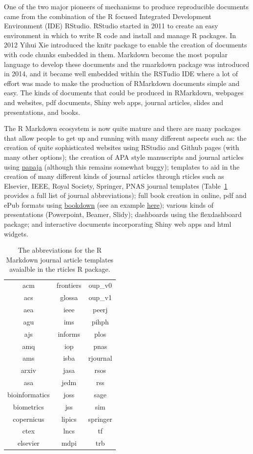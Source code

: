 \documentclass[
  letterpaper,
  DIV=11,
  numbers=noendperiod]{scrreprt}
\begin{document}
One of the two major pioneers of mechanisms to produce reproducible
documents came from the combination of the R focused Integrated
Development Environment (IDE) RStudio. RStudio started in 2011 to create
an easy environment in which to write R code and install and manage R
packages. In 2012 Yihui Xie introduced the knitr package to enable the
creation of documents with code chunks embedded in them. Markdown become
the most popular language to develop these documents and the rmarkdown
package was introduced in 2014, and it became well embedded within the
RSTudio IDE where a lot of effort was made to make the production of
RMarkdown documents simple and easy. The kinds of documents that could
be produced in RMarkdown, webpages and websites, pdf documents, Shiny
web apps, journal articles, slides and presentations, and books.

The R Markdown ecosystem is now quite mature and there are many packages
that allow people to get up and running with many different aspects such
as: the creation of quite sophisticated websites using RStudio and
Github pages (with many other options); the creation of APA style
manuscripts and journal articles using
\href{http://frederikaust.com/papaja_man/}{papaja} (although this
remains somewhat buggy); templates to aid in the creation of many
different kinds of journal articles through rticles such as Elsevier,
IEEE, Royal Society, Springer, PNAS journal templates
(Table~\ref{tbl-rticlesjournals} provides a full list of journal
abbreviations); full book creation in online, pdf and ePub formats using
\href{https://bookdown.org}{bookdown} (see an example
\href{https://bookdown.org/yihui/rmarkdown/}{here}); various kinds of
presentations (Powerpoint, Beamer, Slidy); dashboards using the
flexdashboard package; and interactive documents incorporating Shiny web
apps and html widgets.

\begin{longtable}[]{@{}ccc@{}}

\caption{\label{tbl-rticlesjournals}The abbreviations for the R Markdown
journal article templates avaialble in the rticles R package.}

\tabularnewline

\toprule\noalign{}
\endhead
\bottomrule\noalign{}
\endlastfoot
acm & frontiers & oup\_v0 \\
acs & glossa & oup\_v1 \\
aea & ieee & peerj \\
agu & ims & pihph \\
ajs & informs & plos \\
amq & iop & pnas \\
ams & isba & rjournal \\
arxiv & jasa & rsos \\
asa & jedm & rss \\
bioinformatics & joss & sage \\
biometrics & jss & sim \\
copernicus & lipics & springer \\
ctex & lncs & tf \\
elsevier & mdpi & trb \\

\end{longtable}
\end{document}
